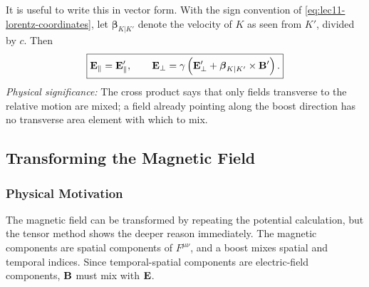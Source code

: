 It is useful to write this in vector form.  With the sign convention of
\eqref{eq:lec11-lorentz-coordinates}, let $\boldsymbol{\beta}_{K|K'}$ denote the
velocity of $K$ as seen from $K'$, divided by $c$.  Then
\begin{equation}\label{eq:lec11-E-vector}
  \boxed{
  \mathbf{E}_{\parallel}=\mathbf{E}'_{\parallel},\qquad
  \mathbf{E}_{\perp}
  =
  \gamma\left(\mathbf{E}'_{\perp}
  +\boldsymbol{\beta}_{K|K'}\times\mathbf{B}'\right).
  }
\end{equation}
\textit{Physical significance:} The cross product says that only fields transverse
to the relative motion are mixed; a field already pointing along the boost direction
has no transverse area element with which to mix.

\subsection{Transforming the Magnetic Field}\label{subsec:lec11-magnetic-transform}

\subsubsection*{Physical Motivation}
The magnetic field can be transformed by repeating the potential calculation, but
the tensor method shows the deeper reason immediately.  The magnetic components
are spatial components of $F^{\mu\nu}$, and a boost mixes spatial and temporal
indices.  Since temporal-spatial components are electric-field components, $\mathbf{B}$
must mix with $\mathbf{E}$.

